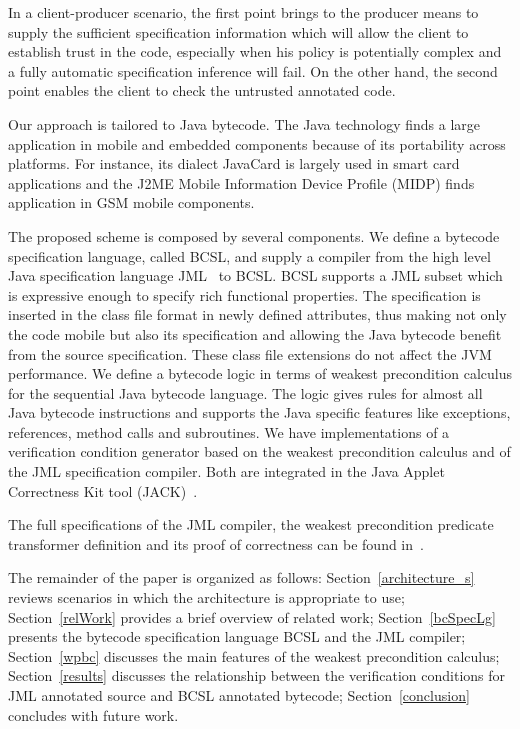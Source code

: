 In a client-producer scenario, the first point brings to the producer means to supply the sufficient specification information 
which will allow the client to establish trust in the code, especially when his policy is potentially complex and a fully automatic specification inference
will fail. On the other hand, the second point enables the client to check the untrusted annotated code. 

  

Our approach is tailored to Java bytecode.
The Java technology finds a large application in mobile and embedded components because of its portability across platforms. 
For instance, its dialect JavaCard is largely used in smart card applications and the J2ME Mobile Information Device Profile 
(MIDP) finds application in GSM mobile components. 

The proposed scheme is composed by several components.
 We define a bytecode specification language, called BCSL, and supply a compiler from 
 the high level Java specification language JML~\cite{JMLRefMan} to BCSL. 
 BCSL supports a JML subset which is expressive enough to specify rich functional properties. 
The specification is inserted in the class file format in newly defined attributes, thus making not only the code mobile but also its specification
and allowing the Java bytecode benefit from the source specification. These class
 file extensions do not affect the JVM performance.
We define a bytecode logic in terms of weakest precondition calculus for the sequential Java bytecode language. 
The logic gives rules for almost all Java bytecode instructions and supports the Java specific features like 
exceptions, references, method calls and subroutines.  
 We have implementations of a verification condition generator based on the weakest precondition calculus and of
 the JML specification compiler. Both are integrated in the Java Applet Correctness Kit tool (JACK)~\cite{BRL-JACK}.

 
 The full specifications of the JML compiler, the weakest precondition predicate transformer definition and its proof of correctness can be found in~\cite{JBL05MP}.
  
The remainder of the paper is organized as follows: 
Section~\ref{architecture_s} reviews scenarios in which the architecture is appropriate to use; 
Section~\ref{relWork} provides a brief overview of related work;
 Section~\ref{bcSpecLg} presents the bytecode specification language BCSL and the JML compiler; Section~\ref{wpbc} discusses the main
features of the weakest precondition calculus; Section~\ref{results} discusses the relationship between the verification conditions for JML annotated source and BCSL annotated bytecode; Section~\ref{conclusion} concludes with future work.  















